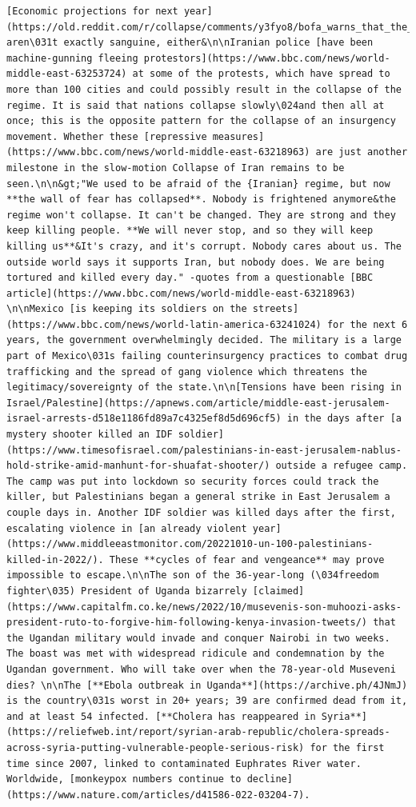 \documentclass[
  letterpaper,
  DIV=11,
  numbers=noendperiod]{scrreprt}
\begin{document}
\begin{verbatim}
[Economic projections for next year](https://old.reddit.com/r/collapse/comments/y3fyo8/bofa_warns_that_the_us_economy_will_start_to_lose/) aren\031t exactly sanguine, either&\n\nIranian police [have been machine-gunning fleeing protestors](https://www.bbc.com/news/world-middle-east-63253724) at some of the protests, which have spread to more than 100 cities and could possibly result in the collapse of the regime. It is said that nations collapse slowly\024and then all at once; this is the opposite pattern for the collapse of an insurgency movement. Whether these [repressive measures](https://www.bbc.com/news/world-middle-east-63218963) are just another milestone in the slow-motion Collapse of Iran remains to be seen.\n\n&gt;"We used to be afraid of the {Iranian} regime, but now **the wall of fear has collapsed**. Nobody is frightened anymore&the regime won't collapse. It can't be changed. They are strong and they keep killing people. **We will never stop, and so they will keep killing us**&It's crazy, and it's corrupt. Nobody cares about us. The outside world says it supports Iran, but nobody does. We are being tortured and killed every day." -quotes from a questionable [BBC article](https://www.bbc.com/news/world-middle-east-63218963) \n\nMexico [is keeping its soldiers on the streets](https://www.bbc.com/news/world-latin-america-63241024) for the next 6 years, the government overwhelmingly decided. The military is a large part of Mexico\031s failing counterinsurgency practices to combat drug trafficking and the spread of gang violence which threatens the legitimacy/sovereignty of the state.\n\n[Tensions have been rising in Israel/Palestine](https://apnews.com/article/middle-east-jerusalem-israel-arrests-d518e1186fd89a7c4325ef8d5d696cf5) in the days after [a mystery shooter killed an IDF soldier](https://www.timesofisrael.com/palestinians-in-east-jerusalem-nablus-hold-strike-amid-manhunt-for-shuafat-shooter/) outside a refugee camp. The camp was put into lockdown so security forces could track the killer, but Palestinians began a general strike in East Jerusalem a couple days in. Another IDF soldier was killed days after the first, escalating violence in [an already violent year](https://www.middleeastmonitor.com/20221010-un-100-palestinians-killed-in-2022/). These **cycles of fear and vengeance** may prove impossible to escape.\n\nThe son of the 36-year-long (\034freedom fighter\035) President of Uganda bizarrely [claimed](https://www.capitalfm.co.ke/news/2022/10/musevenis-son-muhoozi-asks-president-ruto-to-forgive-him-following-kenya-invasion-tweets/) that the Ugandan military would invade and conquer Nairobi in two weeks. The boast was met with widespread ridicule and condemnation by the Ugandan government. Who will take over when the 78-year-old Museveni dies? \n\nThe [**Ebola outbreak in Uganda**](https://archive.ph/4JNmJ) is the country\031s worst in 20+ years; 39 are confirmed dead from it, and at least 54 infected. [**Cholera has reappeared in Syria**](https://reliefweb.int/report/syrian-arab-republic/cholera-spreads-across-syria-putting-vulnerable-people-serious-risk) for the first time since 2007, linked to contaminated Euphrates River water. Worldwide, [monkeypox numbers continue to decline](https://www.nature.com/articles/d41586-022-03204-7). 
\end{verbatim}
\end{document}
